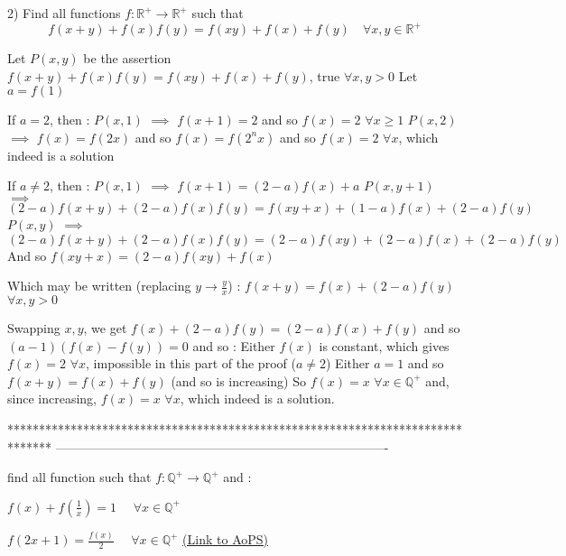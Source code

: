 \begin{solution}
	\begin{tcolorbox}2) Find all functions $f:\mathbb{R}^+\to\mathbb{R}^+$  such that
\[f(x+y)+f(x)f(y)=f(xy)+f(x)+f(y) \quad \forall x,y \in \mathbb{R}^+\]\end{tcolorbox}
Let $P(x,y)$ be the assertion $f(x+y)+f(x)f(y)=f(xy)+f(x)+f(y)$, true $\forall x,y>0$
Let $a=f(1)$

If $a=2$, then :
$P(x,1)$ $\implies$ $f(x+1)=2$ and so $f(x)=2$ $\forall x\ge 1$
$P(x,2)$ $\implies$ $f(x)=f(2x)$ and so $f(x)=f(2^nx)$ and so $\boxed{f(x)=2}$ $\forall x$, which indeed is a solution

If $a\ne 2$, then :
$P(x,1)$ $\implies$ $f(x+1)=(2-a)f(x)+a$
$P(x,y+1)$ $\implies$ $(2-a)f(x+y)+(2-a)f(x)f(y)=f(xy+x)+(1-a)f(x)+(2-a)f(y)$
$P(x,y)$ $\implies$ $(2-a)f(x+y)+(2-a)f(x)f(y)=(2-a)f(xy)+(2-a)f(x)+(2-a)f(y)$
And so $f(xy+x)=(2-a)f(xy)+f(x)$

Which may be written (replacing $y\to \frac yx$) : $f(x+y)=f(x)+(2-a)f(y)$ $\forall x,y>0$

Swapping $x,y$, we get $f(x)+(2-a)f(y)=(2-a)f(x)+f(y)$ and so $(a-1)(f(x)-f(y))=0$ and so :
Either $f(x)$ is constant, which  gives $f(x)=2$ $\forall x$, impossible in this part of the proof ($a\ne 2$)
Either $a=1$ and so $f(x+y)=f(x)+f(y)$ (and so is increasing)
So $f(x)=x$ $\forall x\in\mathbb Q^+$ and, since increasing, $\boxed{f(x)=x}$ $\forall x$, which indeed is a solution.
\end{solution}
*******************************************************************************
-------------------------------------------------------------------------------

\begin{problem}
	find all function such that $f:\mathbb{Q}^{+}\rightarrow \mathbb{Q}^{+}$ and :

$f(x)+f(\frac{1}{x})=1 \: \: \: \: \: \: \forall x\in \mathbb{Q}^{+} $ 

$f(2x+1)=\frac{f(x)}{2}  \: \: \: \: \: \: \forall x\in \mathbb{Q}^{+}$
	\flushright \href{https://artofproblemsolving.com/community/c6h563035}{(Link to AoPS)}
\end{problem}



